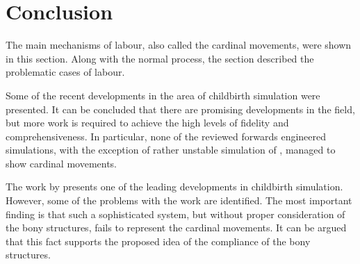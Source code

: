 
\section{Conclusion}

The main mechanisms of labour, also called the cardinal movements, were shown in this section. Along with the normal process, the section described the problematic cases of labour.

Some of the recent developments in the area of childbirth simulation were presented. It can be concluded that there are promising developments in the field, but more work is required to achieve the high levels of fidelity and comprehensiveness. In particular, none of the reviewed forwards engineered simulations, with the exception of rather unstable simulation of \citet{GEIGER}, managed to show cardinal movements.

The work by \citet{BUTTIN} presents one of the leading developments in childbirth simulation. However, some of the problems with the work are identified. The most important finding is that such a sophisticated system, but without proper consideration of the bony structures, fails to represent the cardinal movements. It can be argued that this fact supports the proposed idea of the compliance of the bony structures.
